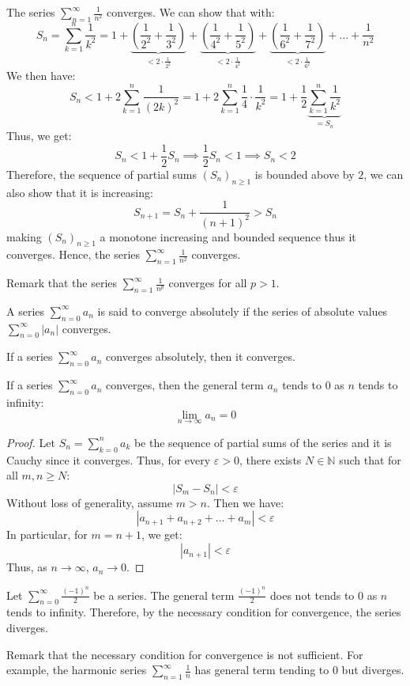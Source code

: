 \begin{eg}
    The series $\sum_{n = 1}^{\infty} \frac{1}{n^2}$ converges. We can show that with:
    \[
        S_n = \sum_{k=1}^n \frac{1}{k^2} = 1 + \underbrace{\left(\frac{1}{2^2} + \frac{1}{3^2}\right)}_{< 2 \cdot \frac{1}{2^2}} + \underbrace{\left(\frac{1}{4^2} + \frac{1}{5^2}\right)}_{< 2 \cdot \frac{1}{4^2}} + \underbrace{\left(\frac{1}{6^2} + \frac{1}{7^2}\right)}_{< 2 \cdot \frac{1}{6^2}} + \ldots + \frac{1}{n^2}
    \]
    We then have:
    \[
        S_n < 1 + 2 \sum_{k = 1}^{n} \frac{1}{(2k)^2} = 1 + 2 \sum_{k = 1}^{n} \frac{1}{4} \cdot \frac{1}{k^2} = 1 + \frac{1}{2} \underbrace{\sum_{k = 1}^{n} \frac{1}{k^2}}_{= S_n}
    \]
    Thus, we get:
    \[
        S_n < 1 + \frac{1}{2} S_n \implies \frac{1}{2} S_n < 1 \implies S_n < 2
    \]
    Therefore, the sequence of partial sums $(S_n)_{n\geq 1}$ is bounded above by $2$, we can also show that it is increasing:
    \[
        S_{n+1} = S_n + \frac{1}{(n+1)^2} > S_n
    \]
    making $(S_n)_{n\geq 1}$ a monotone increasing and bounded sequence thus it converges. Hence, the series $\sum_{n = 1}^{\infty} \frac{1}{n^2}$ converges.
\end{eg}
Remark that the series $\sum_{n = 1}^{\infty} \frac{1}{n^p}$ converges for all $p > 1$.
\begin{definition}
    A series $\sum_{n=0}^{\infty} a_n$ is said to converge absolutely if the series of absolute values $\sum_{n=0}^{\infty} |a_n|$ converges.
\end{definition}
\begin{theorem}
    If a series $\sum_{n=0}^{\infty} a_n$ converges absolutely, then it converges.
\end{theorem}

\begin{definition}
    If a series $\sum_{n=0}^{\infty} a_n$ converges, then the general term $a_n$ tends to $0$ as $n$ tends to infinity:
    \[
        \lim_{n \to \infty} a_n = 0
    \]
\end{definition}
\begin{proof}
    Let $S_n = \sum_{k=0}^n a_k$ be the sequence of partial sums of the series and it is Cauchy since it converges. Thus, for every $\varepsilon > 0$, there exists $N \in \mathbb{N}$ such that for all $m, n \geq N$:
    \[
        |S_m - S_n| < \varepsilon
    \]
    Without loss of generality, assume $m > n$. Then we have:
    \[
        |a_{n+1} + a_{n+2} + \ldots + a_m| < \varepsilon
    \]
    In particular, for $m = n + 1$, we get:
    \[
        |a_{n+1}| < \varepsilon
    \]
    Thus, as $n \to \infty$, $a_n \to 0$.
\end{proof}
\begin{eg}
    Let $\sum_{n = 0}^{\infty} \frac{(-1)^n}{2}$ be a series. The general term $\frac{(-1)^n}{2}$ does not tends to $0$ as $n$ tends to infinity. Therefore, by the necessary condition for convergence, the series diverges.
\end{eg}
Remark that the necessary condition for convergence is not sufficient. For example, the harmonic series $\sum_{n = 1}^{\infty} \frac{1}{n}$ has general term tending to $0$ but diverges.

